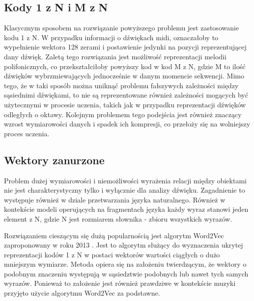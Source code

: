 {{        \subsection{Kody 1 z\,\,N i\,\,M z\,\,N}
        {
            Klasycznym sposobem na rozwiązanie powyższego problemu jest zastosowanie kodu 1 z\,\,N. W\,\,przypadku
            informacji o\,\,dźwiękach midi, oznaczałoby to wypełnienie wektora 128 zerami i\,\,postawienie jedynki na 
            pozycji reprezentującej dany dźwięk. 
            Zaletą tego rozwiązania jest możliwość reprezentacji melodii polifonicznych, co przekształciłoby
            powyższy kod w\,\,kod M\,\,z N, gdzie M\,\,to ilość dźwięków wybrzmiewających jednocześnie w\,\,danym momencie sekwencji.
            Mimo tego, że w\,\,taki sposób można uniknąć problemu fałszywych zależności między sąsiednimi dźwiękami, 
            to nie są reprezentowane również zależności mogących być użytecznymi w\,\,procesie uczenia, 
            takich jak w\,\,przypadku reprezentacji dźwięków odległych o\,\,oktawy. 
            Kolejnym problemem tego podejścia jest również znaczący wzrost wymiarowości danych i\,\,spadek ich kompresji,
            co przełoży się na wolniejszy proces uczenia.
        }

        \subsection{Wektory zanurzone}
        {
            Problem dużej wymiarowości i\,\,niemożliwości wyrażenia relacji między obiektami nie jest
            charakterystyczny tylko i\,\,wyłącznie dla analizy dźwięku. Zagadnienie to  występuje również w\,\,dziale
            przetwarzania języka naturalnego. Również w\,\,kontekście modeli operujących na fragmentach języka każdy wyraz stanowi
            jeden element z\,\,N, gdzie N\,\,jest rozmiarem słownika - zbioru wszystkich wyrazów.

            Rozwiązaniem cieszącym się dużą popularnością jest algorytm Word2Vec zaproponowany w\,\,roku 2013 \cite{Mikolov2013EfficientEO}.
            Jest to algorytm służący do wyznaczenia ukrytej reprezentacji kodów 1 z\,\,N w\,\,postaci wektorów wartości ciągłych
            o\,\,dużo mniejszym wymiarze. Metoda opiera się na założeniu twierdzącym, że wektory 
            o\,\,podobnym znaczeniu występują w\,\,sąsiedztwie podobnych lub nawet tych samych wyrazów. Ponieważ to założenie 
            jest również prawdziwe w\,\,kontekście muzyki przyjęto użycie algorytmu Word2Vec za podstawne.
            
}}}
